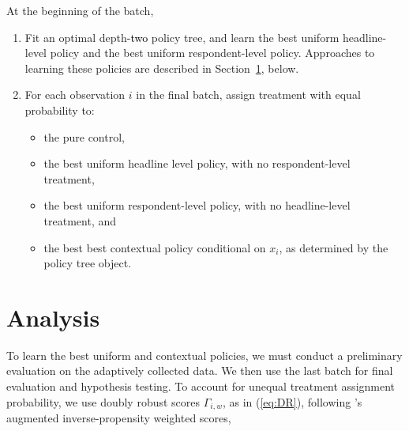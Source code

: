\documentclass[letterpaper, 12pt, parskip=full,DIV=10]{scrartcl}
\begin{document}
\begin{enumerate}
At the beginning of the batch, 
\begin{enumerate}
  \item Fit an optimal depth\textcolor{black}{-two} policy tree, and learn the best uniform headline-level policy and the best uniform respondent-level policy. Approaches to learning these policies are described in Section~\ref{analysis}, below. 
  \item For each observation $i$ in the final batch, assign treatment with equal probability to:\label{step:policies}
  \begin{itemize}
  \item the pure control, 
  \item the best uniform headline level policy, with no respondent-level treatment, 
  \item the best uniform respondent-level policy, with no headline-level treatment, and
  \item the best best contextual policy conditional on $x_i$, as determined by the policy tree object. 
  \end{itemize}
\end{enumerate}
\end{enumerate}


\section{Analysis}\label{analysis}

To learn the best uniform and contextual policies, we must conduct a preliminary evaluation on the adaptively collected data. We then use the last batch for final evaluation and hypothesis testing. To account for unequal treatment assignment probability, we use doubly robust scores $\Gamma_{i,w}$, as in (\ref{eq:DR}), following \cite{robins1994estimation}'s augmented inverse-propensity weighted scores, 
\end{document}
